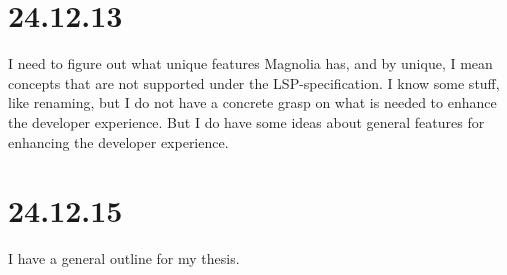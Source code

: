 \section{24.12.13}

I need to figure out what unique features Magnolia has, and by unique, I mean
concepts that are not supported under the LSP-specification. I know some stuff,
like renaming, but I do not have a concrete grasp on what is needed to enhance
the developer experience. But I do have some ideas about general features for
enhancing the developer experience.


\section{24.12.15}

I have a general outline for my thesis.

